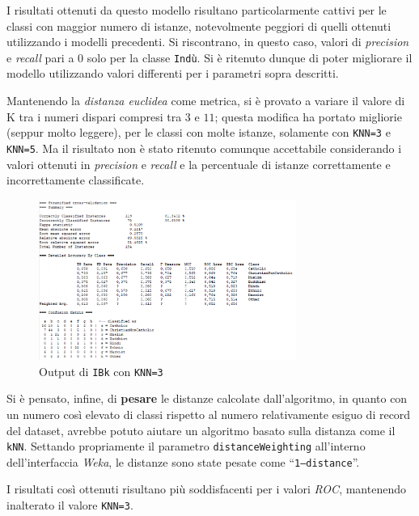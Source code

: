 \documentclass[a4paper,11pt,twoside,notitlepage,final]{scrartcl}
\begin{document}
I risultati ottenuti da questo modello risultano particolarmente cattivi per le classi con maggior numero di istanze, notevolmente peggiori di quelli ottenuti utilizzando i modelli precedenti.
Si riscontrano, in questo caso, valori di \emph{precision} e \emph{recall} pari a \(0\) solo per la classe \texttt{Indù}.
Si è ritenuto dunque di poter migliorare il modello utilizzando valori differenti per i parametri sopra descritti.

Mantenendo la \emph{distanza euclidea} come metrica, si è provato a variare il valore di K tra i numeri dispari compresi tra \(3\) e \(11\);
questa modifica ha portato migliorie (seppur molto leggere), per le classi con molte istanze, solamente con \texttt{KNN=3} e \texttt{KNN=5}.
Ma il risultato non è stato ritenuto comunque accettabile considerando i valori ottenuti in \emph{precision} e \emph{recall} e la percentuale di istanze correttamente e incorrettamente classificate.

\begin{figure}[H]
  \centering
  \includegraphics[width=0.75\textwidth]{fig/kNN3.PNG}%
  \caption{Output di \texttt{IBk} con \texttt{KNN=3}}%
  \label{fig:ibk:9}
\end{figure}

Si è pensato, infine, di \textbf{pesare} le distanze calcolate dall'algoritmo, in quanto con un numero così elevato di classi rispetto al numero relativamente esiguo di record del dataset, avrebbe potuto aiutare un algoritmo basato sulla distanza come il \texttt{kNN}.
Settando propriamente il parametro \texttt{distanceWeighting} all'interno dell'interfaccia \emph{Weka}, le distanze sono state pesate come ``\texttt{1--distance}''.

I risultati così ottenuti risultano più soddisfacenti per i valori \emph{ROC}, mantenendo inalterato il valore \texttt{KNN=3}.
\end{document}

